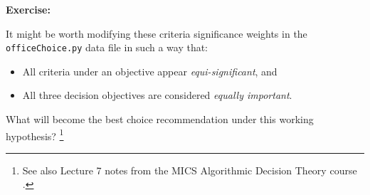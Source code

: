 \noindent \textbf{Exercise:}

\noindent It might be worth modifying these criteria significance weights in the \texttt{officeChoice.py} data file in such a way that:
\begin{itemize}
\item All criteria under an objective appear \emph{equi-significant}, and
\item All three decision objectives are considered \emph{equally important}.
\end{itemize}
What will become the best choice recommendation under this working hypothesis? \footnote{See also Lecture 7 notes from the MICS Algorithmic Decision Theory course \citep{ADT-L7}.} 


\clearpage
{}
{}

\typeout{}

%
